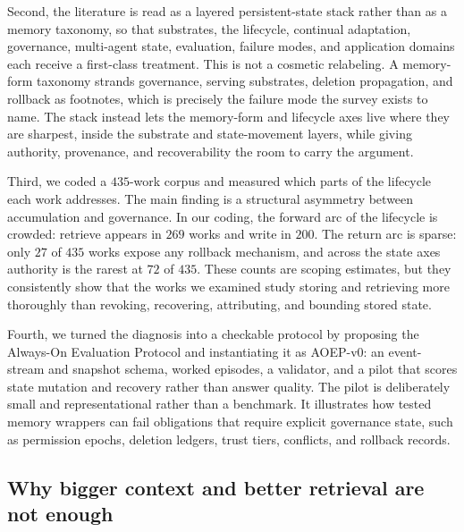 Second, the literature is read as a layered persistent-state stack rather than as a memory taxonomy, so that substrates, the lifecycle, continual adaptation, governance, multi-agent state, evaluation, failure modes, and application domains each receive a first-class treatment. This is not a cosmetic relabeling. A memory-form taxonomy strands governance, serving substrates, deletion propagation, and rollback as footnotes, which is precisely the failure mode the survey exists to name. The stack instead lets the memory-form and lifecycle axes live where they are sharpest, inside the substrate and state-movement layers, while giving authority, provenance, and recoverability the room to carry the argument.

Third, we coded a $435$-work corpus and measured which parts of the lifecycle each work addresses. The main finding is a structural asymmetry between accumulation and governance. In our coding, the forward arc of the lifecycle is crowded: retrieve appears in $269$ works and write in $200$. The return arc is sparse: only $27$ of $435$ works expose any rollback mechanism, and across the state axes authority is the rarest at $72$ of $435$. These counts are scoping estimates, but they consistently show that the works we examined study storing and retrieving more thoroughly than revoking, recovering, attributing, and bounding stored state.

Fourth, we turned the diagnosis into a checkable protocol by proposing the Always-On Evaluation Protocol and instantiating it as AOEP-v0: an event-stream and snapshot schema, worked episodes, a validator, and a pilot that scores state mutation and recovery rather than answer quality. The pilot is deliberately small and representational rather than a benchmark. It illustrates how tested memory wrappers can fail obligations that require explicit governance state, such as permission epochs, deletion ledgers, trust tiers, conflicts, and rollback records.

\subsection{Why bigger context and better retrieval are not enough}

